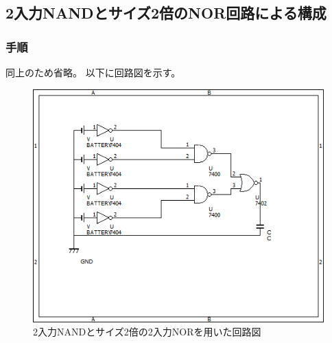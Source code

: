 \documentclass{jsarticle}
\begin{document}
\subsection{2入力NANDとサイズ2倍のNOR回路による構成}
\subsubsection{手順}
    同上のため省略。
    以下に回路図を示す。
    \begin{figure}[H]
        \centering
        \includegraphics[bb=0 0 500 400]{ex3_nand_nand_nor.png}
        \caption{2入力NANDとサイズ2倍の2入力NORを用いた回路図}
    \end{figure}
\end{document}
